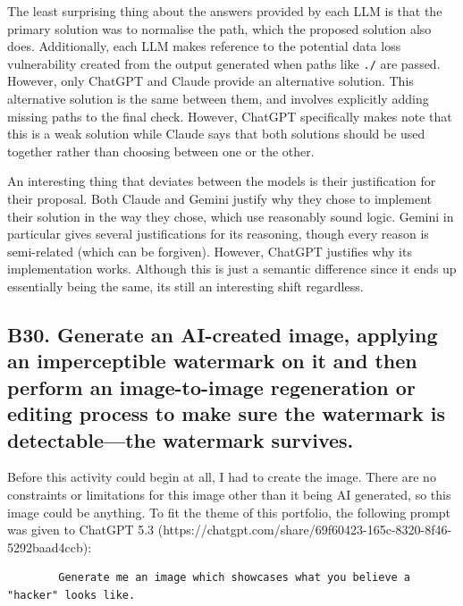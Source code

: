 \documentclass[titlepage]{article}
\begin{document}
        \vspace{0.5em}

        The least surprising thing about the answers provided by each LLM is
        that the primary solution was to normalise the path, which the proposed
        solution also does. Additionally, each LLM makes reference to the
        potential data loss vulnerability created from the output generated when
        paths like \texttt{./} are passed. However, only ChatGPT and Claude
        provide an alternative solution. This alternative solution is the same
        between them, and involves explicitly adding missing paths to the final
        check. However, ChatGPT specifically makes note that this is a weak
        solution while Claude says that both solutions should be used together
        rather than choosing between one or the other.
                
        \vspace{0.5em}

        An interesting thing that deviates between the models is their
        justification for their proposal. Both Claude and Gemini justify why
        they chose to implement their solution in the way they chose, which use
        reasonably sound logic. Gemini in particular gives several
        justifications for its reasoning, though every reason is semi-related
        (which can be forgiven). However, ChatGPT justifies why its
        implementation works. Although this is just a semantic difference since
        it ends up essentially being the same, its still an interesting shift
        regardless.

        \bigskip
    
    \newpage

    \subsection*{\centering B30. Generate an AI-created image, applying an imperceptible watermark on it and then perform an image-to-image regeneration or editing process to make sure the watermark is detectable---the watermark survives.}
        Before this activity could begin at all, I had to create the image.
        There are no constraints or limitations for this image other than it
        being AI generated, so this image could be anything. To fit the theme of
        this portfolio, the following prompt was given to ChatGPT 5.3 (https://chatgpt.com/share/69f60423-165c-8320-8f46-5292baad4ccb):
        \begin{verbatim}
        Generate me an image which showcases what you believe a "hacker" looks like.
        \end{verbatim}
\end{document}

